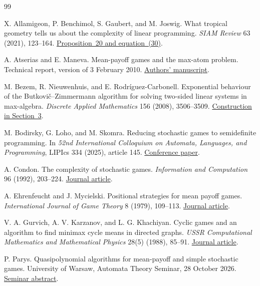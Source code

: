 \documentclass[11pt,letterpaper]{article}
\begin{document}
\clearpage
\begin{thebibliography}{99}

X. Allamigeon, P. Benchimol, S. Gaubert, and M. Joswig.
What tropical geometry tells us about the complexity of linear programming.
\emph{SIAM Review} 63 (2021), 123--164.
\href{https://www.cmap.polytechnique.fr/~gaubert/PAPERS/sigest-paper.pdf\#page=27}{Proposition~20 and equation~(30)}.

A. Atserias and E. Maneva.
Mean-payoff games and the max-atom problem.
Technical report, version of 3 February 2010.
\href{https://www.cs.upc.edu/~atserias/papers/mean-payoff-games-max-atom/mpma.pdf}{Authors' manuscript}.

M. Bezem, R. Nieuwenhuis, and E. Rodr\'iguez-Carbonell.
Exponential behaviour of the Butkovi\v{c}--Zimmermann algorithm for solving two-sided
linear systems in max-algebra.
\emph{Discrete Applied Mathematics} 156 (2008), 3506--3509.
\href{https://www.cs.upc.edu/~roberto/papers/dam08.pdf\#page=4}{Construction in Section~3}.

M. Bodirsky, G. Loho, and M. Skomra.
Reducing stochastic games to semidefinite programming.
In \emph{52nd International Colloquium on Automata, Languages, and Programming},
LIPIcs 334 (2025), article 145.
\href{https://drops.dagstuhl.de/entities/document/10.4230/LIPIcs.ICALP.2025.145}{Conference paper}.

A. Condon. The complexity of stochastic games.
\emph{Information and Computation} 96 (1992), 203--224.
\href{https://doi.org/10.1016/0890-5401(92)90048-K}{Journal article}.

A. Ehrenfeucht and J. Mycielski. Positional strategies for mean payoff games.
\emph{International Journal of Game Theory} 8 (1979), 109--113.
\href{https://doi.org/10.1007/BF01768705}{Journal article}.

V. A. Gurvich, A. V. Karzanov, and L. G. Khachiyan.
Cyclic games and an algorithm to find minimax cycle means in directed graphs.
\emph{USSR Computational Mathematics and Mathematical Physics} 28(5) (1988),
85--91. \href{https://doi.org/10.1016/0041-5553(88)90012-2}{Journal article}.

P. Parys. Quasipolynomial algorithms for mean-payoff and simple stochastic games.
University of Warsaw, Automata Theory Seminar, 28 October 2026.
\href{https://mimuw.edu.pl/en/seminars/talk/quasipolynomial-algorithms-for-mean-payoff-and-simple-stochastic-games/}{Seminar abstract}.


\end{thebibliography}
\end{document}

